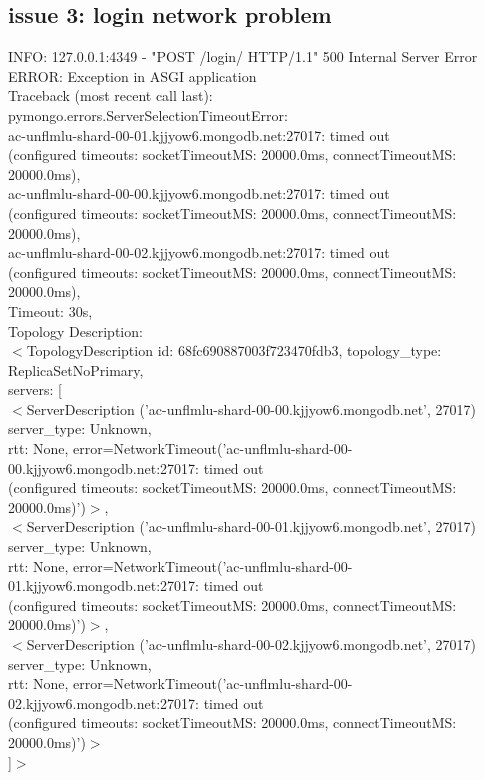 \documentclass[12pt, a4paper]{article}
\begin{document}
    \subsection{issue 3: login network problem}
        \begin{monoblock}
            INFO:     127.0.0.1:4349 - "POST /login/ HTTP/1.1" 500 Internal Server Error \\
            ERROR:    Exception in ASGI application \\
            Traceback (most recent call last): \\
            pymongo.errors.ServerSelectionTimeoutError: \\
            ac-unflmlu-shard-00-01.kjjyow6.mongodb.net:27017: timed out \\
            (configured timeouts: socketTimeoutMS: 20000.0ms, connectTimeoutMS: 20000.0ms), \\
            ac-unflmlu-shard-00-00.kjjyow6.mongodb.net:27017: timed out \\
            (configured timeouts: socketTimeoutMS: 20000.0ms, connectTimeoutMS: 20000.0ms), \\
            ac-unflmlu-shard-00-02.kjjyow6.mongodb.net:27017: timed out \\
            (configured timeouts: socketTimeoutMS: 20000.0ms, connectTimeoutMS: 20000.0ms), \\
            Timeout: 30s, \\
            Topology Description: \\
            $<$TopologyDescription id: 68fc690887003f723470fdb3, topology\_type: ReplicaSetNoPrimary, \\
            servers: [ \\
            $<$ServerDescription ('ac-unflmlu-shard-00-00.kjjyow6.mongodb.net', 27017) server\_type: Unknown, \\
            rtt: None, error=NetworkTimeout('ac-unflmlu-shard-00-00.kjjyow6.mongodb.net:27017: timed out \\
            (configured timeouts: socketTimeoutMS: 20000.0ms, connectTimeoutMS: 20000.0ms)')$>$, \\
            $<$ServerDescription ('ac-unflmlu-shard-00-01.kjjyow6.mongodb.net', 27017) server\_type: Unknown, \\
            rtt: None, error=NetworkTimeout('ac-unflmlu-shard-00-01.kjjyow6.mongodb.net:27017: timed out \\
            (configured timeouts: socketTimeoutMS: 20000.0ms, connectTimeoutMS: 20000.0ms)')$>$, \\
            $<$ServerDescription ('ac-unflmlu-shard-00-02.kjjyow6.mongodb.net', 27017) server\_type: Unknown, \\
            rtt: None, error=NetworkTimeout('ac-unflmlu-shard-00-02.kjjyow6.mongodb.net:27017: timed out \\
            (configured timeouts: socketTimeoutMS: 20000.0ms, connectTimeoutMS: 20000.0ms)')$>$ \\
            ]$>$ \\
        \end{monoblock}
        
\end{document}
